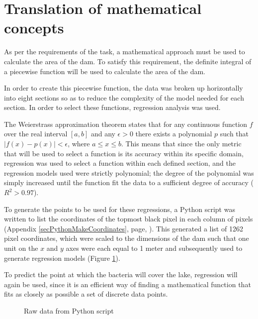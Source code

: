 \documentclass[a4paper]{article}
\theoremstyle{definition}
\begin{document}
\section{Translation of mathematical concepts}
    
    As per the requirements of the task, a mathematical approach must be used to calculate the area of the dam. To satisfy this requirement, the definite integral of a piecewise function will be used to calculate the area of the dam.

    In order to create this piecewise function, the data was broken up horizontally into eight sections so as to reduce the complexity of the model needed for each section. In order to select these functions, regression analysis was used.

    The Weierstrass approximation theorem states that for any continuous function $f$ over the real interval $[a, b]$ and any $\epsilon > 0$ there exists a polynomial $p$ such that $|f(x) - p(x)| < \epsilon$, where $a \leq x \leq b$. This means that since the only metric that will be used to select a function is its accuracy within its specific domain, regression was used to select a function within each defined section, and the regression models used were strictly polynomial; the degree of the polynomial was simply increased until the function fit the data to a sufficient degree of accuracy ($R^2 > 0.97$).

    To generate the points to be used for these regressions, a Python script was written to list the coordinates of the topmost black pixel in each column of pixels (Appendix \ref{secPythonMakeCoordinates}, page, \pageref{secPythonMakeCoordinates}). This generated a list of 1262 pixel coordinates, which were scaled to the dimensions of the dam such that one unit on the $x$ and $y$ axes were each equal to 1 meter and subsequently used to generate regression models (Figure \ref{figRawData}).

    To predict the point at which the bacteria will cover the lake, regression will again be used, since it is an efficient way of finding a mathematical function that fits as closely as possible a set of discrete data points.

    \begin{figure} %
        \centering
        \caption{Raw data from Python script}
        \label{figRawData}
    \end{figure}
\end{document}
